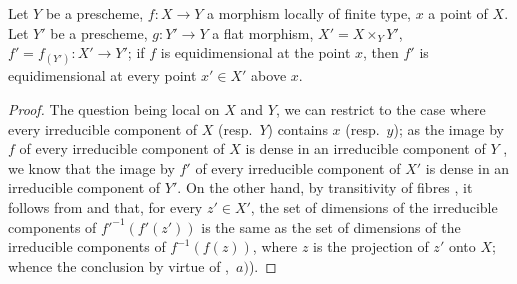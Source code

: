\begin{proposition}[13.3.8]
\label{IV.13.3.8}
Let $Y$ be a prescheme, $f:X\to Y$ a morphism locally of finite type, $x$ a point of $X$.
Let $Y'$ be a prescheme, $g:Y'\to Y$ a flat morphism, $X'=X\times_Y Y'$, $f'=f_{(Y')}:X'\to Y'$; if $f$ is equidimensional at the point $x$, then $f'$ is equidimensional at every point $x'\in X'$ above $x$.
\end{proposition}

\begin{proof}
The question being local on $X$ and $Y$, we can restrict to the case where every irreducible component of $X$ (resp.\ $Y$) contains $x$ (resp.\ $y$); as the image by $f$ of every irreducible component of $X$ is dense in an irreducible component of $Y$ , we know  that the image by $f'$ of every irreducible component of $X'$ is dense in an irreducible component of $Y'$.
On the other hand, by transitivity of fibres , it follows from  and  that, for every $z'\in X'$, the set of dimensions of the irreducible components of ${f'}^{-1}(f'(z'))$ is the same as the set of dimensions of the irreducible components of $f^{-1}(f(z))$, where $z$ is the projection of $z'$ onto $X$; whence the conclusion by virtue of ,~$a)$).
\end{proof}

